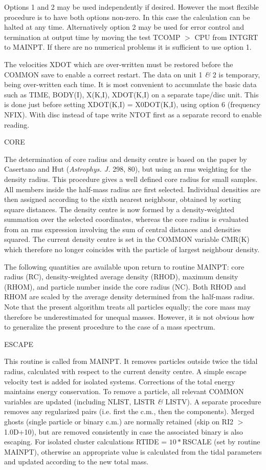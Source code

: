      Options 1 and 2 may be used independently if desired.  However the most
 flexible procedure is to have both options non-zero.  In this case the
 calculation can be halted at any time.  Alternatively option 2 may be used
 for error control and termination at output time by moving the test TCOMP $>$
 CPU from INTGRT to MAINPT.  If there are no
 numerical problems it is sufficient to use option 1.

 The velocities XDOT which are over-written must be restored before the
 COMMON save to enable a correct restart.  
 The data on unit 1 {\it\&} 2 is
 temporary, being over-written each time.  It is most convenient to accumulate
 the basic data such as TIME, BODY(I), X(K,I), XDOT(K,I) on a separate tape/disc
 unit.  This is done just before setting XDOT(K,I) = X0DOT(K,I), using option
 6 (frequency NFIX).  With disc instead of tape write NTOT first 
 as a separate record to enable reading.
\bigskip
\bigskip
\centerline {CORE}
\bigskip

   The determination of core radius and density centre is based on
the paper by Casertano and Hut ({\it Astrophys. J.} 298, 80), but
using an rms weighting for the density radius. This procedure
gives a well defined core radius for small samples.
All members inside the half-mass radius are first selected.
Individual densities are then assigned according to the sixth 
nearest neighbour, obtained by sorting square distances.
The density centre is now formed by a density-weighted summation
over the selected coordinates, whereas the core radius is
evaluated from an rms expression involving the sum of central
distances and densities squared.
The current density centre is set in the COMMON variable CMR(K)
which therefore no longer coincides with the particle of largest
neighbour density.

   The following quantities are available upon return to routine
MAINPT: core radius (RC), density-weighted average density (RHOD),
maximum density (RHOM), and particle number inside the core radius (NC).
Both RHOD and RHOM are scaled by the average density determined
from the half-mass radius.
Note that the present algorithm treats all particles equally; the
core mass may therefore be underestimated for unequal masses.
 However, it is not obvious how to generalize the present procedure
 to the case of a mass spectrum.
\bigskip
\bigskip
\centerline {ESCAPE}
\bigskip

 This routine is called from MAINPT.  It removes particles outside twice the
 tidal radius, calculated with respect to the current density centre.
 A simple escape velocity test is added for isolated
 systems.  Corrections of the total energy maintains energy conservation.
 To remove a particle, all
 relevant COMMON variables are updated (including NLIST, LISTR {\it\&} LISTV).  
 A separate procedure removes any
 regularized pairs (i.e. first the c.m., then the components).  
 Merged ghosts (single particle or binary c.m.) are normally  
 retained (skip on RI2 $>$ 1.0D+10), but are removed consistently 
 in case the associated binary is also escaping. For isolated
 cluster calculations RTIDE = $10\ast$RSCALE (set by routine MAINPT), otherwise 
 an appropriate value is calculated from the tidal parameters and 
 updated according to the new total mass.

